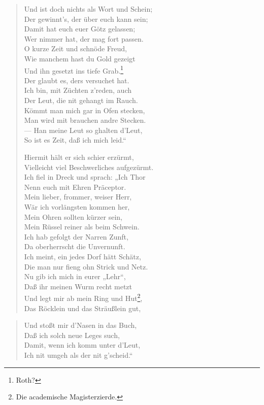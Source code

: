 \begin{verse}
Und ist doch nichts als Wort und Schein;\\
Der gewinnt’s, der über euch kann sein;\\
Damit hat euch euer Götz gelassen;\\
Wer nimmer hat, der mag fort passen.\\
O kurze Zeit und schnöde Freud,\\
Wie manchem hast du Gold gezeigt\\
Und ihn gesetzt ins tiefe Grab.\footnote{Roth?}\\
Der glaubt es, ders versuchet hat.\\
Ich bin, mit Züchten z’reden, auch\\
Der Leut, die nit gehangt im Rauch.\\
Kömmt man mich gar in Ofen stecken,\\
Man wird mit brauchen andre Stecken.\\
— Han meine Leut so ghalten d’Leut,\\
So ist es Zeit, daß ich mich leid.“

Hiermit hält er sich schier erzürmt,\\
Vielleicht viel Beschwerliches aufgezürmt.\\
Ich fiel in Dreck und sprach: „Ich Thor\\
Nenn euch mit Ehren Präceptor.\\
Mein lieber, frommer, weiser Herr,\\
Wär ich vorlängsten kommen her,\\
Mein Ohren sollten kürzer sein,\\
Mein Rüssel reiner als beim Schwein.\\
Ich hab gefolgt der Narren Zunft,\\
Da oberherrscht die Unvernunft.\\
Ich meint, ein jedes Dorf hätt Schätz,\\
Die man nur fieng ohn Strick und Netz.\\
Nu gib ich mich in eurer „Lehr“,\\
Daß ihr meinen Wurm recht metzt\\
Und legt mir ab mein Ring und Hut\footnote{Die academische Magisterzierde.},\\
Das Röcklein und das Sträußlein gut,
\end{verse}

\begin{quote}
Und stoßt mir d’Nasen in das Buch,\\
Daß ich solch neue Leges such,\\
Damit, wenn ich komm unter d’Leut,\\
Ich nit umgeh als der nit g’scheid.“
\end{quote}

